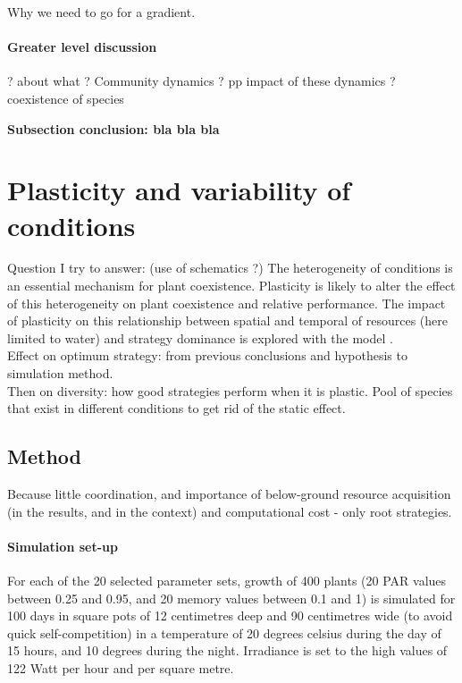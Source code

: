 Why we need to go for a gradient.

\paragraph{Greater level discussion}
? about what ? Community dynamics ? pp impact of these dynamics ? coexistence of species


\textbf{Subsection conclusion: bla bla bla}


\section{Plasticity and variability of conditions}
Question I try to answer: (use of schematics ?)
The heterogeneity of conditions is an essential mechanism for plant coexistence. Plasticity is likely to alter the effect of this heterogeneity on plant coexistence and relative performance. The impact of plasticity on this relationship between spatial and temporal  of resources (here limited to water) and strategy dominance is explored with the model \model.\\

Effect on optimum strategy: from previous conclusions and hypothesis to simulation method.\\
Then on diversity: how good strategies perform when it is plastic. Pool of species that exist in different conditions to get rid of the static effect.

\subsection{Method}

Because little coordination, and importance of below-ground resource acquisition (in the results, and in the context) and computational cost - only root strategies.

\paragraph{Simulation set-up}
For each of the 20 selected parameter sets, growth of 400 plants (20 PAR values between 0.25 and 0.95, and 20 memory values between 0.1 and 1) is simulated for 100 days in square pots of 12 centimetres deep and 90 centimetres wide (to avoid quick self-competition) in a temperature of 20 degrees celsius during the day of 15 hours, and 10 degrees during the night. Irradiance is set to the high values of 122 Watt per hour and per square metre. 

